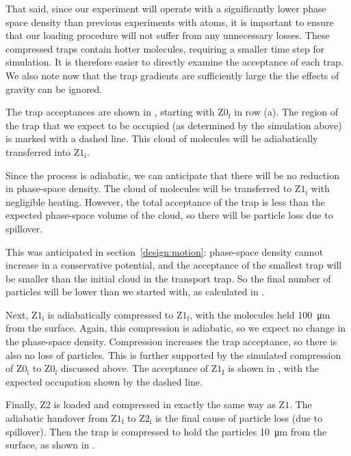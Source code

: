 That said, since our experiment will operate with a significantly lower phase
space density than previous experiments with atoms, it is important to ensure
that our loading procedure will not suffer from any unnecessary losses. These
compressed traps contain hotter molecules, requiring a smaller time step for
simulation. It is therefore easier to directly examine the acceptance of each
trap. We also note now that the trap gradients are sufficiently large the the
effects of gravity can be ignored.

The trap acceptances are shown in ,
starting with $\mathrm{Z0_f}$ in row (a). The region of the trap that we expect
to be occupied (as determined by the simulation above) is marked with a dashed
line.  This cloud of molecules will be adiabatically transferred into
$\mathrm{Z1_i}$.

Since the process is adiabatic, we can anticipate that there will be no
reduction in phase-space density. The cloud of molecules will be transferred to
$\mathrm{Z1_i}$ with negligible heating. However, the total acceptance of the
trap is less than the expected phase-space volume of the cloud, so there
will be particle loss due to spillover.

This was anticipated in section~\ref{design:motion}: phase-space density cannot
increase in a conservative potential, and the acceptance of the smallest trap
will be smaller than the initial cloud in the transport trap. So the final
number of particles will be lower than we started with, as calculated in
.

Next, $\mathrm{Z1_i}$ is adiabatically compressed to $\mathrm{Z1_f}$, with the
molecules held \SI{100}{\micro\meter} from the surface. Again, this
compression is adiabatic, so we expect no change in the phase-space density.
Compression increases the trap acceptance, so there is also no loss of
particles. This is further supported by the simulated compression of
$\mathrm{Z0_i}$ to $\mathrm{Z0_f}$ discussed above. The acceptance of
$\mathrm{Z1_I}$ is shown in , with
the expected occupation shown by the dashed line.

Finally, $\mathrm{Z2}$ is loaded and compressed in exactly the same way as
$\mathrm{Z1}$. The adiabatic handover from $\mathrm{Z1_f}$ to $\mathrm{Z2_i}$
is the final cause of particle loss (due to spillover). Then the trap is
compressed to hold the particles \SI{10}{\micro\meter} from the surface, as
shown in .

